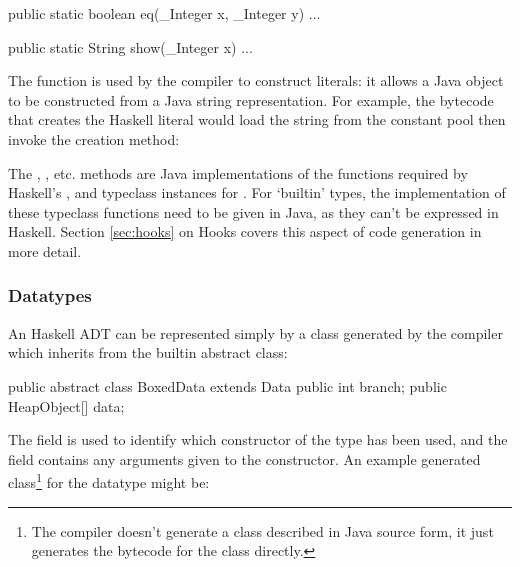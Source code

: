 \documentclass[dissertation.tex]{subfiles}
\begin{document}
{{{\begin{javafigure}
{                public static boolean eq(_Integer x, _Integer y) { ... }

                public static String show(_Integer x) { ... }
            }
            \end{javafigure}

            The  function is used by the compiler to construct  literals: it allows a Java  object to be constructed from a Java string representation. For example, the bytecode that creates the Haskell literal  would load the string  from the constant pool then invoke the creation method:


            The , , etc. methods are Java implementations of the functions required by Haskell's ,  and  typeclass instances for . For `builtin' types, the implementation of these typeclass functions need to be given in Java, as they can't be expressed in Haskell. Section \ref{sec:hooks} on Hooks covers this aspect of code generation in more detail.
        }
        \subsubsection{Datatypes}
        {
            An Haskell ADT can be represented simply by a class generated by the compiler which inherits from the  builtin abstract class:

            \begin{javafigure}
            public abstract class BoxedData extends Data {
                public int branch;
                public HeapObject[] data;
            }
            \end{javafigure}

            The  field is used to identify which constructor of the type has been used, and the  field contains any arguments given to the constructor. An example generated class\footnote{The compiler doesn't generate a class described in Java source form, it just generates the bytecode for the class directly.} for the datatype  might be:

}}}
\end{document}
